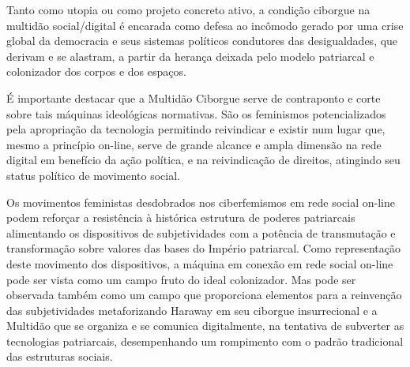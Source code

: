 Tanto como utopia ou como projeto concreto ativo, a condição ciborgue na
multidão social/digital é encarada como defesa ao incômodo gerado por
uma crise global da democracia e seus sistemas políticos condutores das
desigualdades, que derivam e se alastram, a partir da herança deixada
pelo modelo patriarcal e colonizador dos corpos e dos espaços.

É importante destacar que a Multidão Ciborgue serve de contraponto e
corte sobre tais máquinas ideológicas normativas. São os feminismos
potencializados pela apropriação da tecnologia permitindo reivindicar e
existir num lugar que, mesmo a princípio on-line, serve de grande
alcance e ampla dimensão na rede digital em benefício da ação política,
e na reivindicação de direitos, atingindo seu status político de
movimento social.

Os movimentos feministas desdobrados nos ciberfemismos em rede social
on-line podem reforçar a resistência à histórica estrutura de poderes
patriarcais alimentando os dispositivos de subjetividades com a potência
de transmutação e transformação sobre valores das bases do Império
patriarcal. Como representação deste movimento dos dispositivos, a
máquina em conexão em rede social on-line pode ser vista como um campo
fruto do ideal colonizador. Mas pode ser observada também como um campo
que proporciona elementos para a reinvenção das subjetividades
metaforizando Haraway em seu ciborgue insurrecional e a Multidão que se
organiza e se comunica digitalmente, na tentativa de subverter as
tecnologias patriarcais, desempenhando um rompimento com o padrão
tradicional das estruturas sociais.

